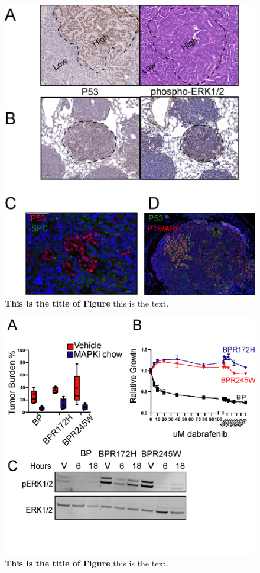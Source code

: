 \begin{figure}
\hypertarget{fig:04}{%
\centering
\includegraphics[width=1\textwidth,height=\textheight]{images/p53_5.png}
\caption{\textbf{This is the title of Figure} this is the text.}\label{fig:04}
}
\end{figure}

\begin{figure}
\hypertarget{fig:04}{%
\centering
\includegraphics[width=1\textwidth,height=\textheight]{images/p536.png}
\caption{\textbf{This is the title of Figure} this is the text.}\label{fig:04}
}
\end{figure}

